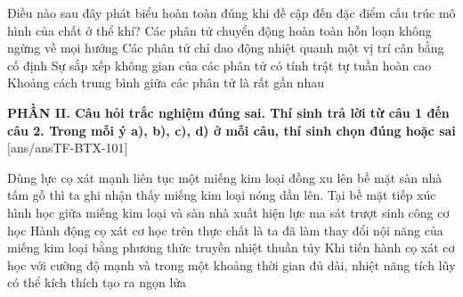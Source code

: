 \begin{ex}	Điều nào sau đây phát biểu hoàn toàn đúng khi đề cập đến đặc điểm cấu trúc mô hình của chất ở thể khí?
	\choice
	{\True Các phân tử chuyển động hoàn toàn hỗn loạn không ngừng về mọi hướng}
	{Các phân tử chỉ dao động nhiệt quanh một vị trí cân bằng cố định}
	{Sự sắp xếp không gian của các phân tử có tính trật tự tuần hoàn cao}
	{Khoảng cách trung bình giữa các phân tử là rất gần nhau}
\end{ex}


\noindent \textbf{PHẦN II. Câu hỏi trắc nghiệm đúng sai. Thí sinh trả lời từ câu 1 đến câu 2. Trong mỗi ý a), b), c), d) ở mỗi câu, thí sinh chọn đúng hoặc sai}
[ans/ansTF-BTX-101]

\begin{ex}	Dùng lực cọ xát mạnh liên tục một miếng kim loại đồng xu lên bề mặt sàn nhà tấm gỗ thì ta ghi nhận thấy miếng kim loại nóng dần lên.
	{\True Tại bề mặt tiếp xúc hình học giữa miếng kim loại và sàn nhà xuất hiện lực ma sát trượt sinh công cơ học}
	{Hành động cọ xát cơ học trên thực chất là ta đã làm thay đổi nội năng của miếng kim loại bằng phương thức truyền nhiệt thuần túy}
	{\True Khi tiến hành cọ xát cơ học với cường độ mạnh và trong một khoảng thời gian đủ dài, nhiệt năng tích lũy có thể kích thích tạo ra ngọn lửa}
\end{ex}

